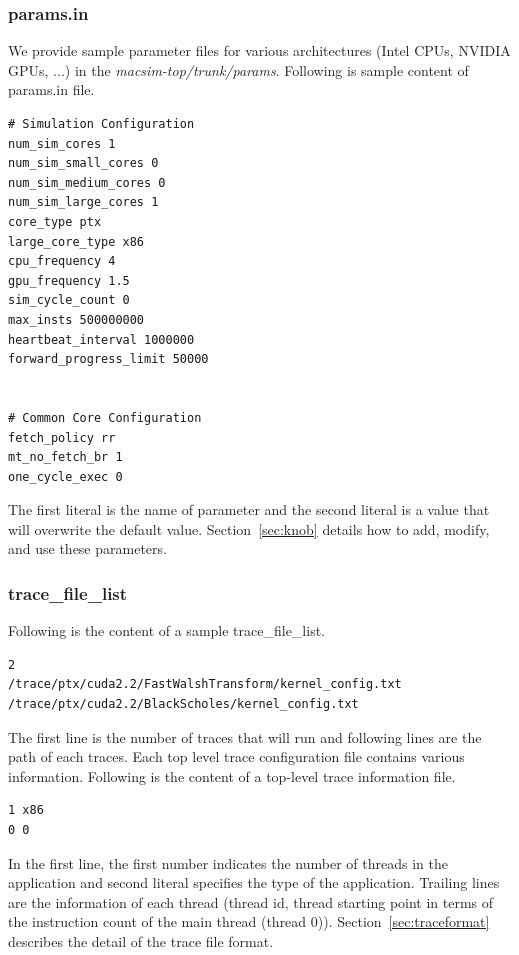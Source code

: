 \subsubsection{params.in}

We provide sample parameter files for various architectures (Intel
CPUs, NVIDIA GPUs, ...) in
the \textit{macsim-top/trunk/params}. Following is sample content of
params.in file.

\begin{Verbatim}
# Simulation Configuration
num_sim_cores 1
num_sim_small_cores 0
num_sim_medium_cores 0
num_sim_large_cores 1
core_type ptx
large_core_type x86
cpu_frequency 4
gpu_frequency 1.5
sim_cycle_count 0
max_insts 500000000
heartbeat_interval 1000000
forward_progress_limit 50000


# Common Core Configuration
fetch_policy rr
mt_no_fetch_br 1
one_cycle_exec 0
\end{Verbatim}

\noindent
The first literal is the name of parameter and the second literal is a
value that will overwrite the default value. Section~\ref{sec:knob}
details how to add, modify, and use these parameters.


\subsubsection{trace\_file\_list}
\label{sec:trace_file_list}

Following is the content of a sample trace\_file\_list.

\begin{Verbatim}
2
/trace/ptx/cuda2.2/FastWalshTransform/kernel_config.txt
/trace/ptx/cuda2.2/BlackScholes/kernel_config.txt
\end{Verbatim}

The first line is the number of traces that \SIM will run and
following lines are the path of each traces. Each top level trace
configuration file contains various information. Following is the
content of a top-level trace information file.


\begin{Verbatim}
1 x86
0 0
\end{Verbatim}

In the first line, the first number indicates the number of threads in
the application and second literal specifies the type of the
application. Trailing lines are the information of each thread
({thread id}, {thread starting point in terms of the instruction count
  of the main thread (thread 0)}). Section~\ref{sec:traceformat}
describes the detail of the trace file format.



